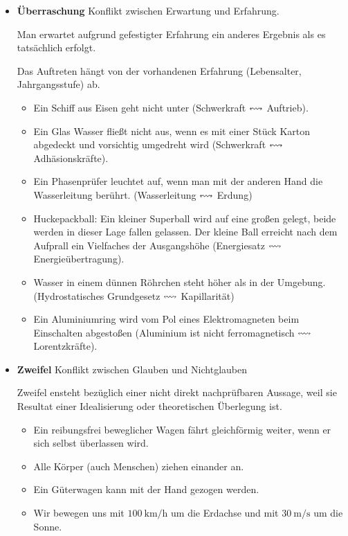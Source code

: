 \begin{itemize}
	\item {\bf \"{U}berraschung}
	Konflikt zwischen Erwartung und Erfahrung.
	
	Man erwartet aufgrund gefestigter Erfahrung ein anderes
	Ergebnis als es tats\"{a}chlich erfolgt.
	
	Das Auftreten h\"{a}ngt von der vorhandenen Erfahrung
	(Lebensalter, Jahrgangsstufe) ab.
	\begin{itemize}
		\item
		Ein Schiff aus Eisen geht nicht
		unter (Schwerkraft $\leftrightsquigarrow$ Auftrieb).
		\item
		Ein Glas Wasser flie{\ss}t nicht aus, wenn es mit einer St\"{u}ck
		Karton abgedeckt und vorsichtig umgedreht wird
		(Schwerkraft $\leftrightsquigarrow$ Adh\"{a}sionskr\"{a}fte).
		\item
		Ein Phasenpr\"{u}fer leuchtet auf, wenn man mit der anderen Hand
		die Wasserleitung ber\"{u}hrt. (Wasserleitung $\leftrightsquigarrow$ Erdung)
		\item
		Huckepackball: Ein kleiner Superball wird auf eine gro{\ss}en gelegt,
		beide werden in dieser Lage fallen gelassen.
		Der kleine Ball erreicht nach dem Aufprall ein
		Vielfaches der Ausgangsh\"{o}he
		(Energiesatz $\leftrightsquigarrow$ Energie\"{u}bertragung).
		\item
		Wasser in einem d\"{u}nnen R\"{o}hrchen steht h\"{o}her als in der Umgebung.
		(Hydrostatisches Grundgesetz $\leftrightsquigarrow$ Kapillarit\"{a}t)
		\item
		Ein Aluminiumring wird vom Pol eines Elektromagneten beim
		Einschalten abgesto{\ss}en
		(Aluminium ist nicht ferromagnetisch $\leftrightsquigarrow$ Lorentzkr\"{a}fte).
	\end{itemize}
	
	\item {\bf Zweifel} Konflikt zwischen Glauben und Nichtglauben
	
	Zweifel ensteht bez\"{u}glich einer nicht direkt nachpr\"{u}fbaren
	Aussage, weil sie Resultat einer Idealisierung oder theoretischen
	\"{U}berlegung ist.
	
	\begin{itemize}
		\item
		Ein reibungsfrei beweglicher Wagen f\"{a}hrt gleichf\"{o}rmig weiter,
		wenn er sich selbst \"{u}berlassen wird.
		\item
		Alle K\"{o}rper (auch Menschen) ziehen einander an.
		\item
		Ein G\"{u}terwagen kann mit der Hand gezogen werden.
		\item
		Wir bewegen uns mit $\SI{100}{\kilo\meter\per\hour}$ um die Erdachse und mit $\SI{30}{\meter\per\second}$
		um die Sonne.
	\end{itemize}
	

\end{itemize}
